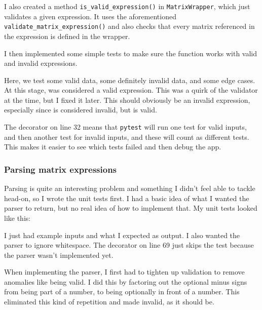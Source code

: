 \documentclass[../main.tex]{subfiles}
\begin{document}
I also created a method \texttt{is\_valid\_expression()} in \texttt{MatrixWrapper}, which just validates a given expression. It uses the aforementioned \texttt{validate\_matrix\_expression()} and also checks that every matrix referenced in the expression is defined in the wrapper.


I then implemented some simple tests to make sure the function works with valid and invalid expressions.


Here, we test some valid data, some definitely invalid data, and some edge cases. At this stage,  was considered a valid expression. This was a quirk of the validator at the time, but I fixed it later. This should obviously be an invalid expression, especially since  is considered invalid, but  is valid.

The  decorator on line 32 means that \texttt{pytest} will run one test for valid inputs, and then another test for invalid inputs, and these will count as different tests. This makes it easier to see which tests failed and then debug the app.

\subsubsection{Parsing matrix expressions\label{development:matrices-backend:parsing-matrix-expressions}}

Parsing is quite an interesting problem and something I didn't feel able to tackle head-on, so I wrote the unit tests first. I had a basic idea of what I wanted the parser to return, but no real idea of how to implement that. My unit tests looked like this:


I just had example inputs and what I expected as output. I also wanted the parser to ignore whitespace. The decorator on line 69 just skips the test because the parser wasn't implemented yet.

When implementing the parser, I first had to tighten up validation to remove anomalies like  being valid. I did this by factoring out the optional minus signs from being part of a number, to being optionally in front of a number. This eliminated this kind of repetition and made  invalid, as it should be.
\end{document}
